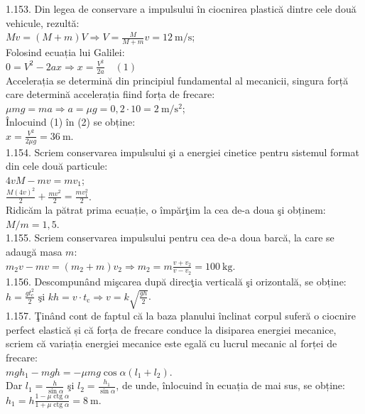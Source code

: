 1.153. Din legea de conservare a impulsului în ciocnirea plastică dintre cele două vehicule, rezultă:\\ $M v=(M+m) V \Rightarrow V=\frac{M}{M+m} v=12 \mathrm{~m} / \mathrm{s}$;\\ Folosind ecuația lui Galilei:\\ $0=V^{2}-2 a x \Rightarrow x=\frac{V^{2}}{2 a} \quad (1)$\\ Accelerația se determină din principiul fundamental al mecanicii, singura forță care determină accelerația fiind forța de frecare:\\ $\mu m g=m a \Rightarrow a=\mu g=0,2 \cdot 10=2 \mathrm{~m} / \mathrm{s}^{2}$;\\ Înlocuind (1) în (2) se obține:\\ $x=\frac{V^{2}}{2 \mu g}=36 \mathrm{~m}$.\\

1.154. Scriem conservarea impulsului şi a energiei cinetice pentru sistemul format din cele două particule:\\ $4 v M-m v=m v_{1}$;\\ $\frac{M(4 v)^{2}}{2}+\frac{m v^{2}}{2}=\frac{m v_{1}^{2}}{2}$.\\ Ridicăm la pătrat prima ecuație, o împărţim la cea de-a doua şi obținem:\\ $M / m=1,5$.\\

1.155. Scriem conservarea impulsului pentru cea de-a doua barcă, la care se adaugă masa $m$:\\ $m_{2} v-m v=\left(m_{2}+m\right) v_{2} \Rightarrow m_{2}=m \frac{v+v_{2}}{v-v_{2}}=100 \mathrm{~kg}$.\\

1.156. Descompunând mişcarea după direcţia verticală şi orizontală, se obține:\\ $h=\frac{g t_{\mathrm{c}}^{2}}{2} \text { şi } k h=v \cdot t_{\mathrm{c}} \Rightarrow v=k \sqrt{\frac{g h}{2}}$.\\

1.157. Ţinând cont de faptul că la baza planului înclinat corpul suferă o ciocnire perfect elastică și că forța de frecare conduce la disiparea energiei mecanice, scriem că variația energiei mecanice este egală cu lucrul mecanic al forței de frecare:\\ $m g h_{1}-m g h=-\mu m g \cos \alpha\left(l_{1}+l_{2}\right)$.\\ Dar $l_{1}=\frac{h}{\sin \alpha}$ şi $l_{2}=\frac{h_{1}}{\sin \alpha}$, de unde, înlocuind în ecuația de mai sus, se obține:\\ $h_{1}=h \frac{1-\mu \operatorname{ctg} \alpha}{1+\mu \operatorname{ctg} \alpha}=8 \mathrm{~m}$.\\

